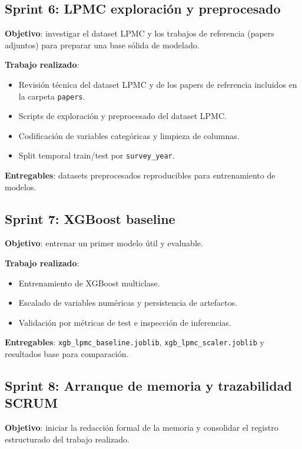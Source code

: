 \subsection{Sprint 6: LPMC exploración y preprocesado}

\textbf{Objetivo}: investigar el dataset LPMC y los trabajos de referencia (papers adjuntos) para preparar una base sólida de modelado.

\textbf{Trabajo realizado}:
\begin{itemize}
  \item Revisión técnica del dataset LPMC y de los papers de referencia incluidos en la carpeta \texttt{papers}.
  \item Scripts de exploración y preprocesado del dataset LPMC.
  \item Codificación de variables categóricas y limpieza de columnas.
  \item Split temporal train/test por \texttt{survey\_year}.
\end{itemize}

\textbf{Entregables}: datasets preprocesados reproducibles para entrenamiento de modelos.

\subsection{Sprint 7: XGBoost baseline}

\textbf{Objetivo}: entrenar un primer modelo útil y evaluable.

\textbf{Trabajo realizado}:
\begin{itemize}
  \item Entrenamiento de XGBoost multiclase.
  \item Escalado de variables numéricas y persistencia de artefactos.
  \item Validación por métricas de test e inspección de inferencias.
\end{itemize}

\textbf{Entregables}: \texttt{xgb\_lpmc\_baseline.joblib}, \texttt{xgb\_lpmc\_scaler.joblib} y resultados base para comparación.

\subsection{Sprint 8: Arranque de memoria y trazabilidad SCRUM}

\textbf{Objetivo}: iniciar la redacción formal de la memoria y consolidar el registro estructurado del trabajo realizado.

